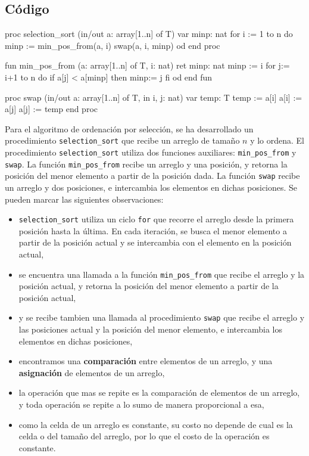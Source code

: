 \subsection{Código}

\begin{pascallike}
proc selection_sort (in/out a: array[1..n] of T)
    var minp: nat
    for i := 1 to n do
        minp := min_pos_from(a, i)
        swap(a, i, minp) 
    od
end proc

fun min_pos_from (a: array[1..n] of T, i: nat) ret minp: nat
    minp := i
    for j:= i+1 to n do 
        if a[j] < a[minp] then 
            minp:= j 
        fi
    od
end fun

proc swap (in/out a: array[1..n] of T, in i, j: nat)
    var temp: T
    temp := a[i]
    a[i] := a[j]
    a[j] := temp
end proc
\end{pascallike}

Para el algoritmo de ordenación por selección, se ha desarrollado un procedimiento \texttt{selection\_sort} que recibe un arreglo de tamaño $n$ y lo ordena. El procedimiento \texttt{selection\_sort} utiliza dos funciones auxiliares: \texttt{min\_pos\_from} y \texttt{swap}. La función \texttt{min\_pos\_from} recibe un arreglo y una posición, y retorna la posición del menor elemento a partir de la posición dada. La función \texttt{swap} recibe un arreglo y dos posiciones, e intercambia los elementos en dichas posiciones. Se pueden marcar las siguientes observaciones:

\begin{itemize}
    \item \texttt{selection\_sort} utiliza un ciclo \texttt{for} que recorre el arreglo desde la primera posición hasta la última. En cada iteración, se busca el menor elemento a partir de la posición actual y se intercambia con el elemento en la posición actual,
    \item se encuentra una llamada a la función \texttt{min\_pos\_from} que recibe el arreglo y la posición actual, y retorna la posición del menor elemento a partir de la posición actual,
    \item y se recibe tambien una llamada al procedimiento \texttt{swap} que recibe el arreglo y las posiciones actual y la posición del menor elemento, e intercambia los elementos en dichas posiciones,
    \item encontramos una \textbf{comparación} entre elementos de un arreglo, y una \textbf{asignación} de elementos de un arreglo,
    \item la operación que mas se repite es la comparación de elementos de un arreglo, y toda operación se repite a lo sumo de manera proporcional a esa,
    \item como la celda de un arreglo es constante, su costo no depende de cual es la celda o del tamaño del arreglo, por lo que el costo de la operación es constante.
\end{itemize}